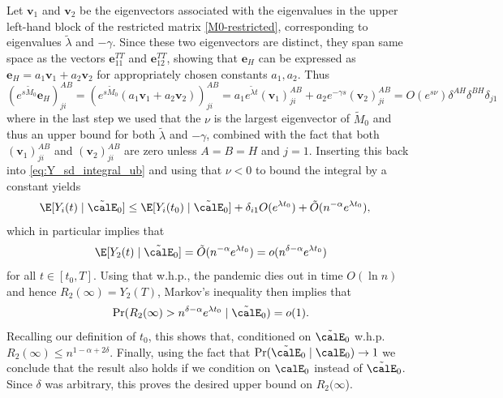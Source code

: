 \documentclass[11pt]{article}
\begin{document}
Let $\mathbf v_1$ and $\mathbf v_2$ be the eigenvectors associated with the eigenvalues in the upper left-hand block of the restricted matrix \eqref{M0-restricted}, 
corresponding to eigenvalues $\tilde \lambda$ and $-\gamma$. Since these two eigenvectors are distinct, they span same space as the vectors $\mathbf e_{11}^{TT}$ and $\mathbf e_{12}^{TT}$, showing that $\mathbf e_H$ can be expressed as $\mathbf e_H=a_1 \mathbf v_1 + a_2 \mathbf v_2$ for appropriately chosen constants $a_1, a_2$. Thus
\[
    (e^{s \tilde M_0}\mathbf e_H)_{ji}^{AB} =(e^{s \tilde M_0} (a_1 \mathbf v_1 + a_2 \mathbf v_2 ))_{ji}^{AB} = a_1 e^{\tilde \lambda t}\left(\mathbf v_1\right)_{ji}^{AB} + a_2 e^{-\gamma s}\left(\mathbf v_2\right)_{ji}^{AB}
  =O(e^{s\nu})\delta^{AH}\delta^{BH}\delta_{j1}
\]
where in the last step we used that the $\nu$ is the largest eigenvector of $\tilde M_0$ and thus an upper bound for both $\tilde \lambda$ and $-\gamma$, combined with the fact that both 
$\left(\mathbf v_1\right)_{ji}^{AB}$ and $\left(\mathbf v_2\right)_{ji}^{AB}$ are zero unless $A=B=H$ and $j=1$. Inserting this back into \eqref{eq:Y_sd_integral_ub} and using that $\nu<0$ to bound the integral by a constant yields
\begin{align*}
    \E[Y_i(t) \mid \tilde \calE_0] &\leq \E[Y_i(t_0) \mid \tilde \calE_0] + \delta_{i1} O(e^{\lambda t_0}) + \tilde O(n^{-\alpha}e^{\lambda t_0}), 
\end{align*}
which in particular implies that
\[
    \E[Y_2(t) \mid \tilde \calE_0] = \tilde O(n^{-\alpha}e^{\lambda t_0})=o(n^{\delta -\alpha}e^{\lambda t_0} )
\]
for all $t\in [t_0,T]$.
Using that w.h.p., the pandemic dies out in time $O(\ln n)$ and hence $R_2(\infty)=Y_2(T)$, Markov's inequality then implies that 
\begin{align*}
    \Pr(R_2(\infty)> n^{\delta -\alpha}e^{\lambda t_0}  \mid \tilde \calE_0) =o(1).
\end{align*}
Recalling our definition of $t_0$, this shows that, conditioned on $\tilde \calE_0$ w.h.p. $R_2(\infty) \leq n^{1-\alpha+2\delta}$. %
Finally, using the fact that $\Pr(\tilde \calE_0 \mid \calE_0) \to 1$ we conclude that the result also holds if we condition on $\calE_0$ instead of $\tilde \calE_0$. Since $\delta$ was arbitrary, this proves the desired upper bound on $R_2(\infty$).
\end{document}
